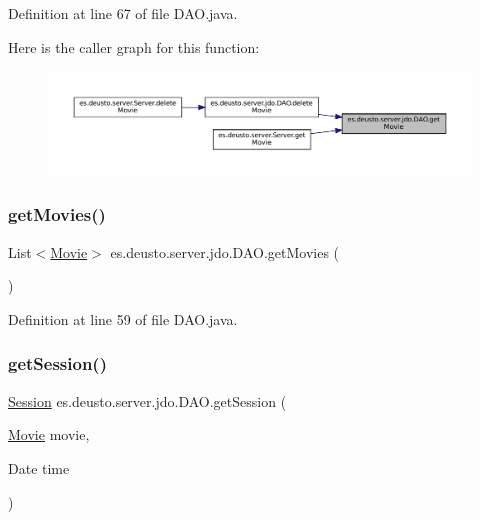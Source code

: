 Definition at line 67 of file D\+A\+O.\+java.

Here is the caller graph for this function\+:
\nopagebreak
\begin{figure}[H]
\begin{center}
\leavevmode
\includegraphics[width=350pt]{classes_1_1deusto_1_1server_1_1jdo_1_1_d_a_o_a9bbbc5fb0fa218f2feefc3c813edc305_icgraph}
\end{center}
\end{figure}
\mbox{\label{classes_1_1deusto_1_1server_1_1jdo_1_1_d_a_o_a23dfafaa747b95ec24c9df6ca678e7d7}} 
\subsubsection{\texorpdfstring{getMovies()}{getMovies()}}
{\footnotesize\ttfamily List$<$\mbox{\hyperlink{classes_1_1deusto_1_1server_1_1jdo_1_1_movie}{Movie}}$>$ es.\+deusto.\+server.\+jdo.\+D\+A\+O.\+get\+Movies (\begin{DoxyParamCaption}{ }\end{DoxyParamCaption})}



Definition at line 59 of file D\+A\+O.\+java.

\mbox{\label{classes_1_1deusto_1_1server_1_1jdo_1_1_d_a_o_a34f9e5400280bbc1a9fce9143696470e}} 
\subsubsection{\texorpdfstring{getSession()}{getSession()}}
{\footnotesize\ttfamily \mbox{\hyperlink{classes_1_1deusto_1_1server_1_1jdo_1_1_session}{Session}} es.\+deusto.\+server.\+jdo.\+D\+A\+O.\+get\+Session (\begin{DoxyParamCaption}\item[{\mbox{\hyperlink{classes_1_1deusto_1_1server_1_1jdo_1_1_movie}{Movie}}}]{movie,  }\item[{Date}]{time }\end{DoxyParamCaption})}



